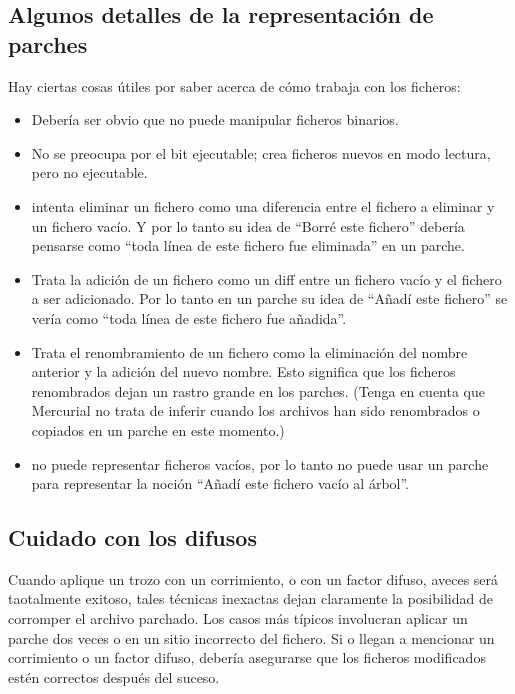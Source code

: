 \subsection{Algunos detalles de la representación de parches}

Hay ciertas cosas útiles por saber acerca de cómo trabaja
 con los ficheros:
\begin{itemize}
\item Debería ser obvio que  no puede manipular
  ficheros binarios.
\item No se preocupa por el bit ejecutable; crea ficheros nuevos en
  modo lectura, pero no ejecutable.
\item {} intenta eliminar un fichero como una diferencia
  entre el fichero a eliminar y un fichero vacío.  Y por lo tanto su
  idea de ``Borré este fichero'' debería pensarse como ``toda línea de
  este fichero fue eliminada'' en un parche.
\item Trata la adición de un fichero como un diff entre un fichero
  vacío y el fichero a ser adicionado.  Por lo tanto en un parche su
  idea de ``Añadí este fichero'' se vería como ``toda línea de este
  fichero fue añadida''.
\item Trata el renombramiento de un fichero como la eliminación del
  nombre anterior y la adición del nuevo nombre.  Esto significa que
  los ficheros renombrados dejan un rastro grande en los parches.
  (Tenga en cuenta que Mercurial no trata de inferir cuando los
  archivos han sido renombrados o copiados en un parche en este
  momento.)
\item {} no puede representar ficheros vacíos, por lo
  tanto no puede usar un parche para representar la noción ``Añadí
  este fichero vacío al árbol''.
\end{itemize}
\subsection{Cuidado con los difusos}

Cuando aplique un trozo con un corrimiento, o con un factor difuso,
aveces será taotalmente exitoso, tales técnicas inexactas dejan
claramente la posibilidad de corromper el archivo parchado.  Los casos
más típicos involucran aplicar un parche dos veces o en un sitio
incorrecto del fichero. Si  o  llegan
a mencionar un corrimiento o un factor difuso, debería asegurarse que
los ficheros modificados estén correctos después del suceso.

